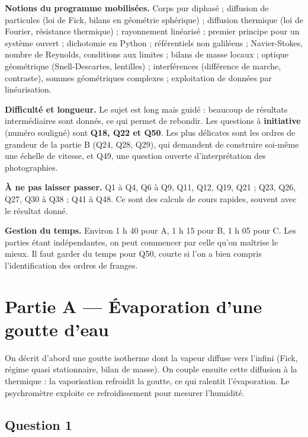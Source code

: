 \documentclass[11pt,a4paper]{article}
\begin{document}
\textbf{Notions du programme mobilisées.} Corps pur diphasé ; diffusion de particules (loi de Fick, bilans en géométrie sphérique) ; diffusion thermique (loi de Fourier, résistance thermique) ; rayonnement linéarisé ; premier principe pour un système ouvert ; dichotomie en Python ; référentiels non galiléens ; Navier-Stokes, nombre de Reynolds, conditions aux limites ; bilans de masse locaux ; optique géométrique (Snell-Descartes, lentilles) ; interférences (différence de marche, contraste), sommes géométriques complexes ; exploitation de données par linéarisation.

\textbf{Difficulté et longueur.} Le sujet est long mais guidé : beaucoup de résultats intermédiaires sont donnés, ce qui permet de rebondir. Les questions à \textbf{initiative} (numéro souligné) sont \textbf{Q18, Q22 et Q50}. Les plus délicates sont les ordres de grandeur de la partie B (Q24, Q28, Q29), qui demandent de construire soi-même une échelle de vitesse, et Q49, une question ouverte d'interprétation des photographies.

\textbf{À ne pas laisser passer.} Q1 à Q4, Q6 à Q9, Q11, Q12, Q19, Q21 ; Q23, Q26, Q27, Q30 à Q38 ; Q41 à Q48. Ce sont des calculs de cours rapides, souvent avec le résultat donné.

\textbf{Gestion du temps.} Environ 1 h 40 pour A, 1 h 15 pour B, 1 h 05 pour C. Les parties étant indépendantes, on peut commencer par celle qu'on maîtrise le mieux. Il faut garder du temps pour Q50, courte si l'on a bien compris l'identification des ordres de franges.

\hypertarget{partie-a-uxe9vaporation-dune-goutte-deau}{%
\section{Partie A --- Évaporation d'une goutte d'eau}\label{partie-a-uxe9vaporation-dune-goutte-deau}}

On décrit d'abord une goutte isotherme dont la vapeur diffuse vers l'infini (Fick, régime quasi stationnaire, bilan de masse). On couple ensuite cette diffusion à la thermique : la vaporisation refroidit la goutte, ce qui ralentit l'évaporation. Le psychromètre exploite ce refroidissement pour mesurer l'humidité.

\hypertarget{question-1}{%
\subsection{Question 1}\label{question-1}}
\end{document}
